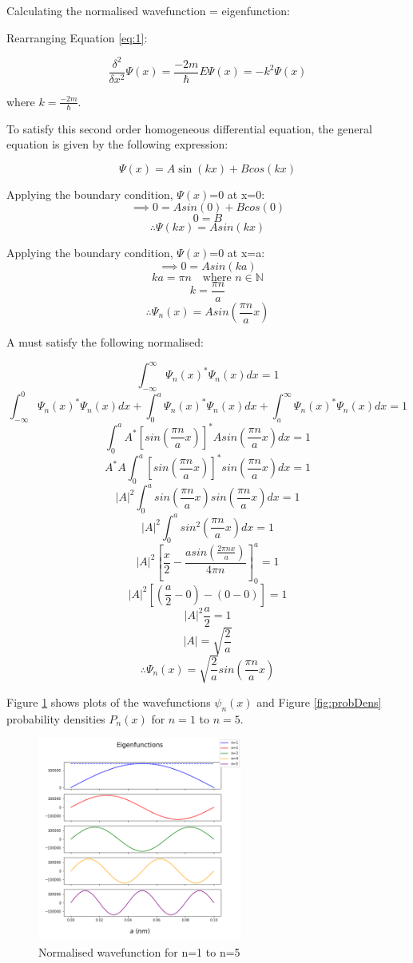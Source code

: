 Calculating the normalised wavefunction = eigenfunction:

Rearranging Equation \ref{eq:1}:

$$\frac{\delta^{2}}{\delta x^{2}}\Psi (x) = \frac{-2m}{\hbar} E \Psi (x) = -k^2 \Psi (x)$$

where $k=\frac{-2m}{\hbar}$.

To satisfy this second order homogeneous differential equation, the general equation is given by the following expression:

$$\Psi (x) = A \sin(kx) + B cos(kx)$$

Applying the boundary condition, $\Psi (x)$=0 at x=0:
$$\implies 0 = A sin(0) + B cos(0)$$
$$ 0 = B$$
$$\therefore \Psi (kx) = A sin(kx)$$

Applying the boundary condition, $\Psi (x)$=0 at x=a:
$$\implies 0 = A sin(ka)$$ 
$$ ka = \pi n \quad \text{where } n \in \mathbb{N}$$
$$ k = \frac{\pi n}{a}$$
$$\therefore \Psi_n (x) = A sin(\frac{\pi n}{a}x)$$

A must satisfy the following normalised:

$$\int_{ -\infty}^{\infty}\Psi_n (x)^{*}\Psi_n (x)dx = 1$$
$$\int_{ -\infty}^{0}\Psi_n (x)^{*}\Psi_n (x)dx +\int_{0}^{a}\Psi_n (x)^{*}\Psi_n (x)dx + \int_{ a}^{\infty}\Psi_n (x)^{*}\Psi_n (x)dx= 1$$
$$\int_{ 0}^{a} A^{*} [sin(\frac{\pi n}{a}x)]^{*}A sin(\frac{\pi n}{a}x)dx = 1$$
$$A^{*}A\int_{ 0}^{a} [sin(\frac{\pi n}{a}x)]^{*}sin(\frac{\pi n}{a}x)dx = 1$$
$$\left | A \right |^2 \int_{ 0}^{a} sin(\frac{\pi n}{a}x) sin(\frac{\pi n}{a}x)dx = 1$$
$$\left | A \right |^2 \int_{ 0}^{a} sin^{2}(\frac{\pi n}{a}x)dx = 1$$
$$\left | A \right |^2 \left[\frac{x}{2}-\frac{asin(\frac{2 \pi nx}{a})}{4 \pi n}\right]_0^a= 1$$
$$\left | A \right |^2 [(\frac{a}{2}-0)-(0-0)]= 1$$
$$\left | A \right |^2 \frac{a}{2}= 1$$
$$\left | A \right | = \sqrt{\frac{2}{a}}$$
$$\therefore \Psi_n (x) = \sqrt{\frac{2}{a}} sin(\frac{\pi n}{a}x)$$ %

Figure \ref{fig:normWave} shows plots of the wavefunctions $\psi_n(x)$ and Figure \ref{fig:probDens} probability densities $P_n(x)$ for $n=1$ to $n=5$. 
 
\begin{figure}[h]
    \centering
    \includegraphics[width=0.6\textwidth]{lab1/images/normalisedWavefunction.png}
    \caption{Normalised wavefunction for n=1 to n=5}
    \label{fig:normWave}
\end{figure}

